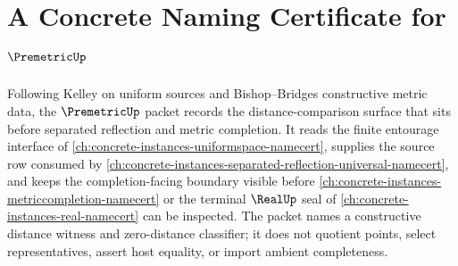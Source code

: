 \chapter{A Concrete Naming Certificate for $\PremetricUp$}
\label{ch:concrete-instances-premetric-namecert}

Following Kelley on uniform sources and Bishop--Bridges constructive metric data, the $\PremetricUp$ packet records the distance-comparison surface that sits before separated reflection and metric completion. It reads the finite entourage interface of \autoref{ch:concrete-instances-uniformspace-namecert}, supplies the source row consumed by \autoref{ch:concrete-instances-separated-reflection-universal-namecert}, and keeps the completion-facing boundary visible before \autoref{ch:concrete-instances-metriccompletion-namecert} or the terminal $\RealUp$ seal of \autoref{ch:concrete-instances-real-namecert} can be inspected. The packet names a constructive distance witness and zero-distance classifier; it does not quotient points, select representatives, assert host equality, or import ambient completeness.

